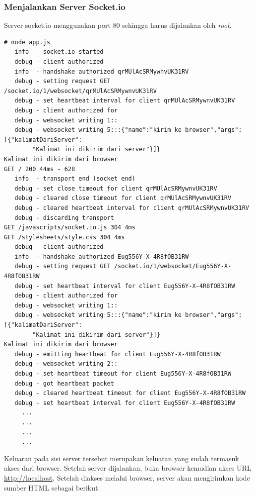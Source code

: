 \subsubsection{Menjalankan Server Socket.io}

Server socket.io menggunakan port 80 sehingga harus dijalankan oleh \textit{root}. 

\lstset{language=Bash,caption=Menjalankan server Socket.io}
\begin{lstlisting}
# node app.js 
   info  - socket.io started
   debug - client authorized
   info  - handshake authorized qrMUlAcSRMywnvUK31RV
   debug - setting request GET /socket.io/1/websocket/qrMUlAcSRMywnvUK31RV
   debug - set heartbeat interval for client qrMUlAcSRMywnvUK31RV
   debug - client authorized for 
   debug - websocket writing 1::
   debug - websocket writing 5:::{"name":"kirim ke browser","args":[{"kalimatDariServer":
		"Kalimat ini dikirim dari server"}]}
Kalimat ini dikirim dari browser
GET / 200 44ms - 628
   info  - transport end (socket end)
   debug - set close timeout for client qrMUlAcSRMywnvUK31RV
   debug - cleared close timeout for client qrMUlAcSRMywnvUK31RV
   debug - cleared heartbeat interval for client qrMUlAcSRMywnvUK31RV
   debug - discarding transport
GET /javascripts/socket.io.js 304 4ms
GET /stylesheets/style.css 304 4ms
   debug - client authorized
   info  - handshake authorized Eug556Y-X-4R8fOB31RW
   debug - setting request GET /socket.io/1/websocket/Eug556Y-X-4R8fOB31RW
   debug - set heartbeat interval for client Eug556Y-X-4R8fOB31RW
   debug - client authorized for 
   debug - websocket writing 1::
   debug - websocket writing 5:::{"name":"kirim ke browser","args":[{"kalimatDariServer":
		"Kalimat ini dikirim dari server"}]}
Kalimat ini dikirim dari browser
   debug - emitting heartbeat for client Eug556Y-X-4R8fOB31RW
   debug - websocket writing 2::
   debug - set heartbeat timeout for client Eug556Y-X-4R8fOB31RW
   debug - got heartbeat packet
   debug - cleared heartbeat timeout for client Eug556Y-X-4R8fOB31RW
   debug - set heartbeat interval for client Eug556Y-X-4R8fOB31RW
	 ...
	 ...
	 ...
	 ...
\end{lstlisting}

Keluaran pada sisi server tersebut merupakan keluaran yang sudah termasuk akses dari browser. Setelah server dijalankan, buka browser kemudian akses URL \url{http://localhost}. Setelah diakses melalui browser, server akan mengirimkan kode sumber HTML sebagai berikut:


